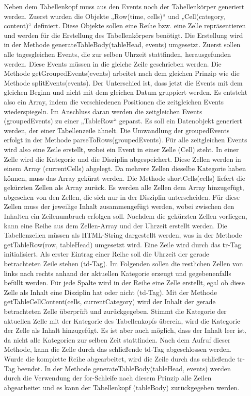 {Neben dem Tabellenkopf muss aus den Events noch der Tabellenkörper generiert werden. Zuerst wurden die Objekte „Row(time, cells)“ und „Cell(category, content)“ definiert. Diese Objekte sollen eine Reihe bzw. eine Zelle repräsentieren und werden für die Erstellung des Tabellenkörpers benötigt. 
Die Erstellung wird in der Methode generateTableBody(tableHead, events) umgesetzt. Zuerst sollen alle tagesgleichen Events, die zur selben Uhrzeit stattfinden, herausgefunden werden. Diese Events müssen in die gleiche Zeile geschrieben werden. Die Methode getGroupedEvents(events) arbeitet nach dem gleichen Prinzip wie die Methode splitEvents(events). Der Unterschied ist, dass jetzt die Events mit dem gleichen Beginn und nicht mit dem gleichen Datum gruppiert werden. Es entsteht also ein Array, indem die verschiedenen Positionen die zeitgleichen Events wiederspiegeln.
Im Anschluss daran werden die zeitgleichen Events (groupedEvents) zu einer „TableRow“ geparst. Es soll ein Datenobjekt generiert werden, der einer Tabellenzeile ähnelt. Die Umwandlung der groupedEvents erfolgt in der Methode parseToRows(groupedEvents). Für alle zeitgleichen Events wird also eine Zeile erstellt, wobei ein Event in einer Zelle (Cell) steht. In einer Zelle wird die Kategorie und die Disziplin abgespeichert. Diese Zellen werden in einem Array (currentCells) abgelegt. Da mehrere Zellen dieselbe Kategorie haben können, muss das Array gekürzt werden. 
Die Methode shortCells(cells) liefert die gekürzten Zellen als Array zurück. Es werden alle Zellen dem Array hinzugefügt, abgesehen von den Zellen, die sich nur in der Disziplin unterscheiden. Für diese Zellen muss der jeweilige Inhalt zusammengefügt werden, wobei zwischen den Inhalten ein Zeilenumbruch erfolgen soll. 
Nachdem die gekürzten Zellen vorliegen, kann eine Reihe aus dem Zellen-Array und der Uhrzeit erstellt werden. 
Die Tabellenzeilen müssen als HTML-String dargestellt werden, was in der Methode getTableRow(row, tableHead) umgesetzt wird. Eine Zeile wird durch das tr-Tag initialisiert. Als erster Eintrag einer Reihe soll die Uhrzeit der gerade betrachteten Zeile stehen (td-Tag). Im Folgenden sollen die restlichen Zellen von links nach rechts anhand der aktuellen Kategorie erzeugt und gegebenenfalls befüllt werden. Für jede Spalte wird in der Reihe eine Zelle erstellt, egal ob diese Zelle als Inhalt eine Disziplin hat oder nicht (td-Tag). Mit der Methode getTableCellContent(cells, currentCategory) wird der Inhalt der gerade betrachteten Zelle überprüft und zurückgegeben. Stimmt die Kategorie der aktuellen Zelle mit der Kategorie des Tabellenkopfs überein, wird die Kategorie der Zelle als Inhalt hinzugefügt. Es ist aber auch möglich, dass der Inhalt leer ist, da nicht alle Kategorien zur selben Zeit stattfinden. Nach dem Aufruf dieser Methode, kann die Zelle durch das schließende td-Tag abgeschlossen werden. Wurde die komplette Reihe abgearbeitet, wird die Zeile durch das schließende tr-Tag beendet. 
In der Methode generateTableBody(tableHead, events) werden durch die Verwendung der for-Schleife nach diesem Prinzip alle Zeilen abgearbeitet und es kann der Tabellenkopf (tableBody) zurückgegeben werden.

}
